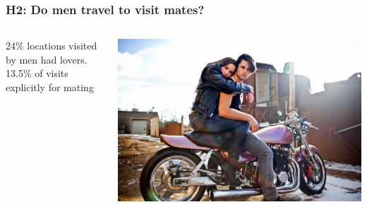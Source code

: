 \documentclass{beamer}
\begin{document}
\begin{frame}
\frametitle{H2: Do men travel to visit mates?}

\begin{columns}
\begin{column}{.6\textwidth}
24\% locations visited by men had lovers. \\
\vspace{0.75cm} 
13.5\% of visits explicitly for mating \\
\vspace{0.75cm} 
\end{column}

\begin{column}{.4\textwidth}
\includegraphics[width=1\linewidth]{travelmate}
\end{column}

\end{columns}

\end{frame}

\end{document}
